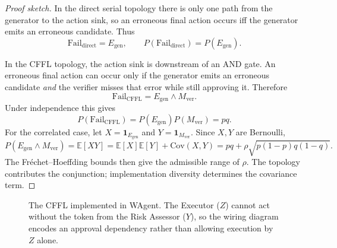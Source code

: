\begin{proof}[Proof sketch]
In the direct serial topology there is only one path from the generator to the action sink, so an erroneous final action occurs iff the generator emits an erroneous candidate. Thus
\[
\mathrm{Fail}_{\mathrm{direct}} = E_{\mathrm{gen}},
\qquad
P(\mathrm{Fail}_{\mathrm{direct}})=P(E_{\mathrm{gen}}).
\]

In the CFFL topology, the action sink is downstream of an AND gate. An erroneous final action can occur only if the generator emits an erroneous candidate \emph{and} the verifier misses that error while still approving it. Therefore
\[
\mathrm{Fail}_{\mathrm{CFFL}} = E_{\mathrm{gen}} \wedge M_{\mathrm{ver}}.
\]
Under independence this gives
\[
P(\mathrm{Fail}_{\mathrm{CFFL}})=P(E_{\mathrm{gen}})P(M_{\mathrm{ver}})=pq.
\]
For the correlated case, let $X=\mathbf{1}_{E_{\mathrm{gen}}}$ and $Y=\mathbf{1}_{M_{\mathrm{ver}}}$. Since $X,Y$ are Bernoulli,
\[
P(E_{\mathrm{gen}} \wedge M_{\mathrm{ver}})=\mathbb{E}[XY]
=\mathbb{E}[X]\mathbb{E}[Y]+\mathrm{Cov}(X,Y)
=pq+\rho\sqrt{p(1-p)q(1-q)}.
\]
The Fr\'echet--Hoeffding bounds then give the admissible range of $\rho$. The topology contributes the conjunction; implementation diversity determines the covariance term.
\end{proof}

\begin{figure}[h]
\centering
{}
	\caption{The CFFL implemented in WAgent. The Executor ($Z$) cannot act without the token from the Risk Assessor
	($Y$), so the wiring diagram encodes an approval dependency rather than allowing execution by $Z$ alone.}
		\end{figure}

